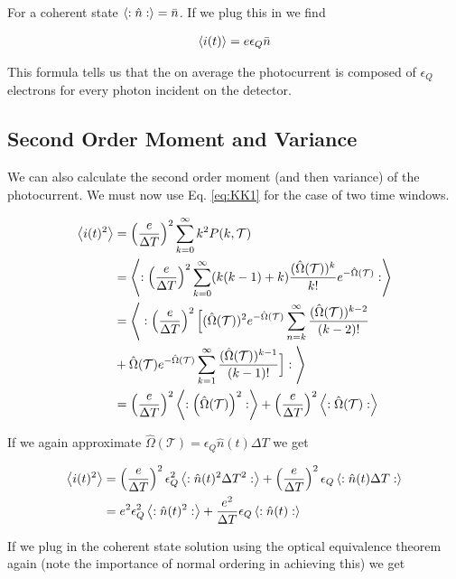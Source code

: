 \documentclass[12pt]{article}
\newcommand{\ep}{\epsilon}
\newcommand{\mc}[1]{\mathcal{#1}}
\begin{document}
 For a coherent state $\Braket{:\hat{n}:} = \bar{n}$. If we plug this in we find

\begin{align}
\Braket{i(t)} = e \ep_Q \bar{n}
\end{align}

This formula tells us that the on average the photocurrent is composed of $\ep_Q$ electrons for every photon incident on the detector.

\subsection{Second Order Moment and Variance}

We can also calculate the second order moment (and then variance) of the photocurrent. We must now use Eq. \eqref{eq:KK1} for the case of two time windows.

\begin{align}
\Braket{i(t)^2} &= \left(\frac{e}{\Delta T}\right)^2 \sum_{k=0}^{\infty} k^2 P(k,\mc{T})\\
&=\Braket{:\left(\frac{e}{\Delta T}\right)^2 \sum_{k=0}^{\infty} (k(k-1) + k) \frac{(\hat{\Omega}(\mc{T}))^k}{k!} e^{-\hat{\Omega}(\mc{T})}:}\\
&= \Bigg \langle:\left(\frac{e}{\Delta T}\right)^2 \Big[(\hat{\Omega}(\mc{T}))^2 e^{-\hat{\Omega}(\mc{T})} \sum_{n=k}^{\infty} \frac{(\hat{\Omega}(\mc{T}))^{k-2}}{(k-2)!}\\
& + \hat{\Omega}(\mc{T}) e^{-\hat{\Omega}(\mc{T})} \sum_{k=1}^{\infty} \frac{(\hat{\Omega}(\mc{T}))^{k-1}}{(k-1)!}\Big]: \Bigg \rangle\\
&= \left(\frac{e}{\Delta T}\right)^2 \Braket{:\left(\hat{\Omega}(\mc{T})\right)^2:} + \left(\frac{e}{\Delta T}\right)^2 \Braket{:\hat{\Omega}(\mc{T}):}
\end{align}

If we again approximate $\hat{\Omega}(\mc{T}) = \ep_Q \hat{n}(t) \Delta T$ we get

\begin{align}
\Braket{i(t)^2} &= \left( \frac{e}{\Delta T} \right)^2 \ep_Q^2 \Braket{:\hat{n}(t)^2 \Delta T^2 :} + \left(\frac{e}{\Delta T}\right)^2 \ep_Q \Braket{:\hat{n}(t) \Delta T :}\\
&= e^2 \ep_Q^2 \Braket{:\hat{n}(t)^2:} + \frac{e^2}{\Delta T} \ep_Q\Braket{:\hat{n}(t):}
\end{align}

If we plug in the coherent state solution using the optical equivalence theorem again (note the importance of normal ordering in achieving this) we get
\end{document}

